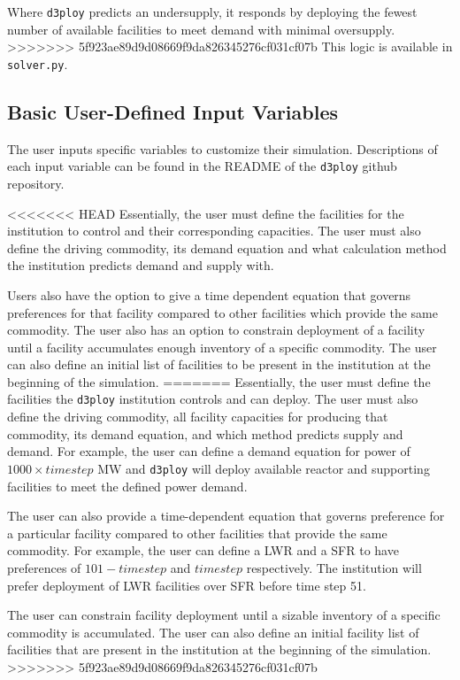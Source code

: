 \documentclass[11pt,letterpaper]{article}
\newcommand{\deploy}{\texttt{d3ploy}\xspace}%
\begin{document}
Where \deploy predicts an undersupply, it responds by deploying 
the fewest number of available facilities to meet demand with minimal 
oversupply.  
>>>>>>> 5f923ae89d9d08669f9da826345276cf031cf07b
This logic is available in \texttt{solver.py}. 

\subsection{\textbf{Basic User-Defined Input Variables}}
The user inputs specific variables to customize their
simulation. 
Descriptions of each input variable can be found in the 
README of the \deploy github repository.

<<<<<<< HEAD
Essentially, the user must define the facilities for the 
institution to control and their corresponding capacities. 
The user must also define the driving commodity, its demand 
equation and what calculation method the institution predicts 
demand and supply with. 

Users also have the option to give a time dependent equation that governs
preferences for that facility compared to other facilities which 
provide the same commodity. 
The user also has an option to constrain deployment of a facility 
until a facility accumulates enough inventory of a specific commodity.
The user can also define an initial list of facilities to 
be present in the institution at the beginning of the simulation. 
=======
Essentially, the user must define the facilities the 
\deploy institution controls and can deploy. 
The user must also define the driving commodity, all facility capacities 
for producing that commodity, its demand 
equation, and which method predicts supply and demand. 
For example, the user can define a demand equation for power of 
$1000 \times timestep$ MW and \deploy will deploy available reactor and supporting 
facilities to meet the defined power demand. 

The user can also provide a time-dependent equation that governs
preference for a particular facility compared to other facilities that 
provide the same commodity. 
For example, the user can define a \gls{LWR} and a \gls{SFR} to have
preferences of $101 - timestep$ and $timestep$ respectively. 
The institution will prefer deployment of \gls{LWR} facilities over 
\gls{SFR} before time step 51. 

The user can constrain facility deployment 
until a sizable inventory of a specific commodity is accumulated.  
The user can also define an initial facility list of facilities that 
are present in the institution at the beginning of the simulation. 
>>>>>>> 5f923ae89d9d08669f9da826345276cf031cf07b
\end{document}
